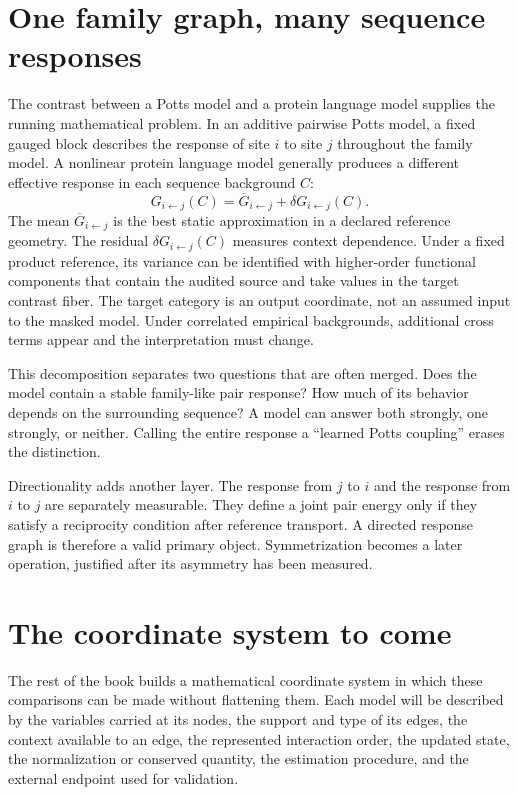 \section{One family graph, many sequence responses}

The contrast between a Potts model and a protein language model supplies the running mathematical
problem.  In an additive pairwise Potts model, a fixed gauged block describes the response of site
$i$ to site $j$ throughout the family model.  A nonlinear protein language model generally
produces a different effective response in each sequence background $C$:
\begin{equation}
G_{i\leftarrow j}(C)
=\overline G_{i\leftarrow j}+\delta G_{i\leftarrow j}(C).
\label{eq:central-thesis}
\end{equation}
The mean $\overline G_{i\leftarrow j}$ is the best static approximation in a declared reference
geometry.  The residual $\delta G_{i\leftarrow j}(C)$ measures context dependence.  Under a fixed
product reference, its variance can be identified with higher-order functional components that
contain the audited source and take values in the target contrast fiber.  The target category is an
output coordinate, not an assumed input to the masked model.  Under correlated empirical backgrounds, additional cross terms
appear and the interpretation must change.

This decomposition separates two questions that are often merged.  Does the model contain a
stable family-like pair response?  How much of its behavior depends on the surrounding sequence?
A model can answer both strongly, one strongly, or neither.  Calling the entire response a
``learned Potts coupling'' erases the distinction.

Directionality adds another layer.  The response from $j$ to $i$ and the response from $i$ to $j$
are separately measurable.  They define a joint pair energy only if they satisfy a reciprocity
condition after reference transport.  A directed response graph is therefore a valid primary
object.  Symmetrization becomes a later operation, justified after its asymmetry has been measured.

\section{The coordinate system to come}

The rest of the book builds a mathematical coordinate system in which these comparisons can be
made without flattening them.  Each model will be described by the variables carried at its nodes,
the support and type of its edges, the context available to an edge, the represented interaction
order, the updated state, the normalization or conserved quantity, the estimation procedure, and
the external endpoint used for validation.

